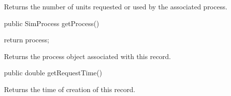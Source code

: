 \begin{tabb}   Returns the number of units requested or used
   by the associated process.
\end{tabb}
\begin{htmlonly}
\end{htmlonly}
\begin{code}

   public SimProcess getProcess()\begin{hide} {
      return process;
   }\end{hide}
\end{code}
\begin{tabb}   Returns the process object associated with this record.
\end{tabb}
\begin{htmlonly}
\end{htmlonly}
\begin{code}

   public double getRequestTime()\begin{hide} {
      return requestTime;
   }
}\end{hide}
\end{code}
\begin{tabb}   Returns the time of creation of this record.  
\end{tabb}
\begin{htmlonly}
\end{htmlonly}
